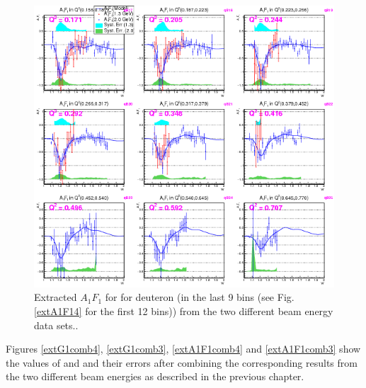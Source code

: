 \begin{figure}[H] %
  \leavevmode \includegraphics[width=1.0\textwidth]{figuresEG4/FigResults/extractedFrmBothEb_A1F1_C71S181NoQeWbins70LessQ2binsNwPd3.png} 
  \caption[Extracted $A_1 F_1$ in the next 9 \qsqs bins]{Extracted $A_1 F_1$ for for deuteron (in the last 9 \qsqs bins (see Fig. \ref{extA1F14} for the first 12 bins)) from the two different beam energy data sets..}
  \label{extA1F13}  
\end{figure}










Figures \ref{extG1comb4}, \ref{extG1comb3}, \ref{extA1F1comb4} and \ref{extA1F1comb3} show the values of \gone and \afone and their errors after combining the corresponding results %
from the two different beam energies as described in the previous chapter. 


